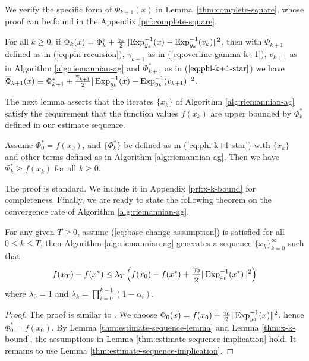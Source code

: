 We verify the specific form of $\overline{\Phi}_{k+1}(x)$ in Lemma~\ref{thm:complete-square}, whose proof can be found in the Appendix \ref{prf:complete-square}.
\begin{lemma} \label{thm:complete-square}
	For all $k\ge 0$, if $\Phi_k(x) = \Phi_k^* + \frac{\gamma_k}{2}\|\mathrm{Exp}_{y_k}^{-1}(x)-\mathrm{Exp}_{y_k}^{-1}(v_k)\|^2$, then with $\overline{\Phi}_{k+1}$ defined as in (\ref{eq:phi-recursion}), $\overline{\gamma}_{k+1}$ as in (\ref{eq:overline-gamma-k+1}), $v_{k+1}$ as in Algorithm \ref{alg:riemannian-ag} and $\Phi_{k+1}^*$ as in ($\ref{eq:phi-k+1-star}$) we have $\overline{\Phi}_{k+1}(x) \equiv \Phi_{k+1}^* + \frac{\overline{\gamma}_{k+1}}{2}\|\mathrm{Exp}_{y_k}^{-1}(x)-\mathrm{Exp}_{y_k}^{-1}(v_{k+1})\|^2$.
\end{lemma}
The next lemma asserts that the iterates $\{x_k\}$ of Algorithm \ref{alg:riemannian-ag} satisfy the requirement that the function values $f(x_k)$ are upper bounded by $\Phi_k^*$ defined in our estimate sequence.
\begin{lemma} \label{thm:x-k-bound}
	Assume $\Phi_0^*=f(x_0)$, and $\{\Phi_k^*\}$ be defined as in (\ref{eq:phi-k+1-star}) with $\{x_k\}$ and other terms defined as in Algorithm \ref{alg:riemannian-ag}. Then we have $\Phi_{k}^*\ge f(x_k)$ for all $k\ge 0$.
\end{lemma}
The proof is standard. We include it in Appendix \ref{prf:x-k-bound} for completeness.
Finally, we are ready to state the following theorem on the convergence rate of Algorithm \ref{alg:riemannian-ag}.

\begin{theorem} \label{thm:main-theorem-general-scheme}
	For any given $T\ge 0$, assume (\ref{eq:base-change-assumption}) is satisfied for all $0\le k\le T$, then Algorithm \ref{alg:riemannian-ag} generates a sequence $\{x_k\}_{k=0}^{\infty}$ such that
	\begin{equation} \label{eq:convergence-algorithm-1}
	 f(x_T) - f(x^*) \le \lambda_T\left(f(x_0) - f(x^*) + \frac{\gamma_0}{2}\|\mathrm{Exp}_{x_0}^{-1}(x^*)\|^2 \right)
	 \end{equation}
	where $\lambda_0 = 1$ and $\lambda_k = \prod_{i=0}^{k-1}(1-\alpha_i)$.
\end{theorem}
\begin{proof}
	The proof is similar to \citep[Theorem 2.2.1]{nesterov2004introductory}. We choose $\Phi_0(x) = f(x_0) + \frac{\gamma_0}{2}\|\mathrm{Exp}_{y_0}^{-1}(x)\|^2$, hence $\Phi_0^* = f(x_0)$. By Lemma \ref{thm:estimate-sequence-lemma} and Lemma \ref{thm:x-k-bound}, the assumptions in Lemma \ref{thm:estimate-sequence-implication} hold. It remains to use Lemma \ref{thm:estimate-sequence-implication}.
\end{proof}

